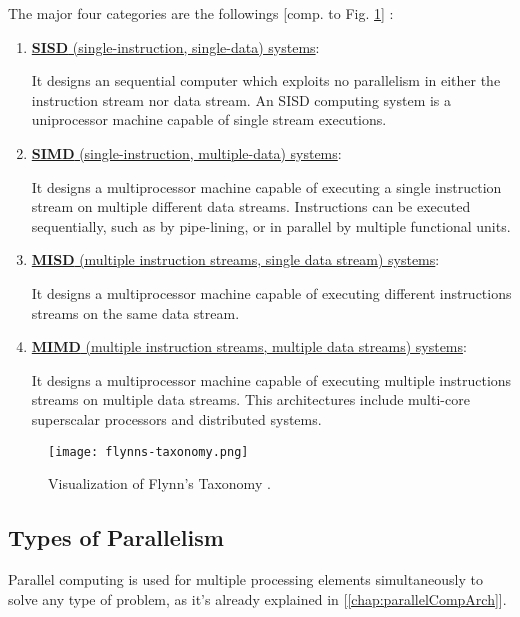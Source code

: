 \newpage

\noindent The major four categories are the followings [comp. to Fig. \ref{fig:flynnsTax}] \parencite{book1}:
\begin{enumerate}
	\item \underline{\textbf{SISD} (single-instruction, single-data) systems}:
	
		  It designs an sequential computer which exploits no parallelism in either the instruction stream nor data stream.  An SISD computing system  is a uniprocessor machine capable of single stream executions.
		  
	\item \underline{\textbf{SIMD} (single-instruction, multiple-data) systems}:
	
		  It designs a multiprocessor machine capable of executing a single instruction stream on multiple different data streams. Instructions can be executed sequentially, such as by pipe-lining,  or in parallel by multiple functional units.
		  
	\item \underline{\textbf{MISD} (multiple instruction streams, single data stream) systems}:
	
		  It designs a multiprocessor machine capable of executing different instructions streams on the same data stream.
	
	\item \underline{\textbf{MIMD} (multiple instruction streams, multiple data streams)  systems}:
	
		  It designs a multiprocessor machine capable of executing multiple instructions streams on multiple data streams. This architectures include multi-core superscalar processors and distributed systems. 	  
\end{enumerate}

\begin{figure}[h!]
	\centering
	\texttt{[image: flynns-taxonomy.png]}
	\caption{
		Visualization of Flynn's Taxonomy \parencite[see][p5]{internet1}.
	}
	\label{fig:flynnsTax}
\end{figure}


\newpage

\subsection{Types of Parallelism}\label{subchap:typesOfParallelism}

Parallel computing is used for multiple processing elements simultaneously to solve any type of problem, as it's already explained in [\ref{chap:parallelCompArch}].

